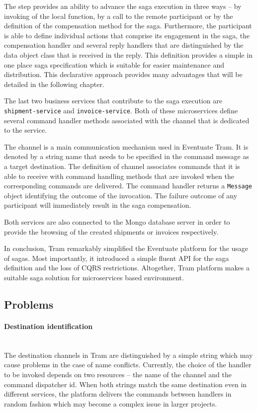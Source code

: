 \documentclass[oneside,
  digital, %
  table,   %
  nolof,     %
  nolot,     %
]{fithesis3}
\newcommand{\newlinepar}[1]{\paragraph{#1}\needspace{4\baselineskip}\mbox{}\\}
\begin{document}
The step provides an ability to advance the saga execution in three ways -- by invoking of the local function, by a call to the remote participant or by the definition of the compensation method for the saga. Furthermore, the participant is able to define individual actions that comprise its engagement in the saga, the compensation handler and several reply handlers that are distinguished by the data object class that is received in the reply. This definition provides a simple in one place saga specification which is suitable for easier maintenance and distribution. This declarative approach provides many advantages that will be detailed in the following chapter.

The last two business services that contribute to the saga execution are \texttt{shipment-service} and \texttt{invoice-service}. Both of these microservices define several command handler methods associated with the channel that is dedicated to the service. 

The channel is a main communication mechanism used in Eventuate Tram. It is denoted by a string name that needs to be specified in the command message as a target destination. The definition of channel associates commands that it is able to receive with command handling methods that are invoked when the corresponding commands are delivered. The command handler returns a \texttt{Message} object identifying the outcome of the invocation. The failure outcome of any participant will immediately result in the saga compensation.

Both services are also connected to the Mongo database server in order to provide the browsing of the created shipments or invoices respectively.

In conclusion, Tram remarkably simplified the Eventuate platform for the usage of sagas. Most importantly, it introduced a simple fluent API for the saga definition and the loss of CQRS restrictions. Altogether, Tram platform makes a suitable saga solution for microservices based environment.

\subsection{Problems}

\newlinepar{Destination identification}

The destination channels in Tram are distinguished by a simple string which may cause problems in the case of name conflicts. Currently, the choice of the handler to be invoked depends on two resources -- the name of the channel and the command dispatcher id. When both strings match the same destination even in different services, the platform delivers the commands between handlers in random fashion which may become a complex issue in larger projects.
\end{document}
